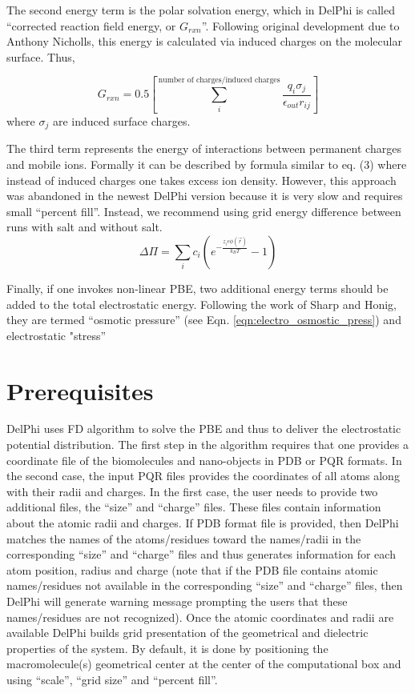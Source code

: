 \documentclass[9pt,tutorial]{livecoms}
\begin{document}
The second energy term is the polar solvation energy, which in DelPhi is called “corrected reaction field energy, or $ G_{rxn} $”. Following original development due to Anthony Nicholls, this energy is calculated via induced charges on the molecular surface. Thus, 

\begin{equation}
    G_{rxn} = 0.5 \left[ \sum_i^{\text{number of charges/induced charges}}{\frac{q_i \sigma_j}{\epsilon_{out}r_{ij}}} \right]
\end{equation}
where $ \sigma_j $ are induced surface charges. 

The third term represents the energy of interactions between permanent charges and mobile ions. Formally it can be described by formula similar to eq. (3) where instead of induced charges one takes excess ion density. However, this approach was abandoned in the newest DelPhi version because it is very slow and requires small “percent fill”. Instead, we recommend using grid energy difference between runs with salt and without salt. 
\begin{equation}\label{eqn:electro_osmostic_press}
    \Delta \Pi = \sum_i{c_i(e^{-\frac{z_ie\phi(\Vec{r})}{k_BT}} - 1)}
\end{equation}

Finally, if one invokes non-linear PBE, two additional energy terms should be added to the total electrostatic energy. Following the work of Sharp and Honig\cite{sharp1990electrostatic}, they are termed “osmotic pressure” (see Eqn. \ref{eqn:electro_osmostic_press}) and electrostatic "stress”



\section{Prerequisites}

DelPhi uses FD algorithm to solve the PBE and thus to deliver the electrostatic potential distribution. The first step in the algorithm requires that one provides a coordinate file of the biomolecules and nano-objects in PDB or PQR formats. In the second case, the input PQR files provides the coordinates of all atoms along with their radii and charges. In the first case, the user needs to provide two additional files, the “size” and “charge” files. These files contain information about the atomic radii and charges. If PDB format file is provided, then DelPhi matches the names of the atoms/residues toward the names/radii in the corresponding “size” and “charge” files and thus generates information for each atom position, radius and charge (note that if the PDB file contains atomic names/residues not available in the corresponding “size” and “charge” files, then DelPhi will generate warning message prompting the users that these names/residues are not recognized). Once the atomic coordinates and radii are available DelPhi builds grid presentation of the geometrical and dielectric properties of the system. By default, it is done by positioning the macromolecule(s) geometrical center at the center of the computational box and using “scale”, “grid size” and “percent fill”. 
\end{document}
